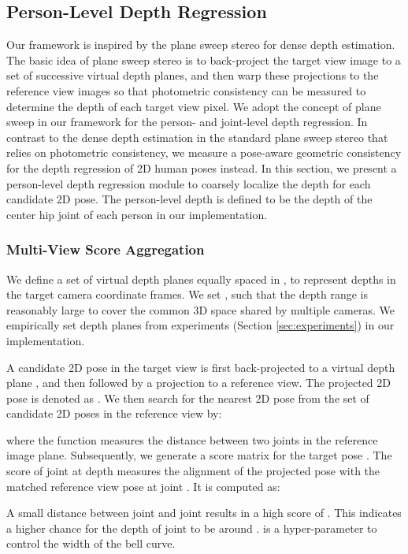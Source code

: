 \documentclass[final]{cvpr}
\begin{document}
\subsection{Person-Level Depth Regression}\label{subsec:person-level}

Our framework is inspired by the plane sweep stereo for dense depth estimation.
The basic idea of plane sweep stereo is to back-project the target view image to a set of successive virtual depth planes, and then warp these projections to the reference view images so that photometric consistency can be measured to determine the depth of each target view pixel.
We adopt the concept of plane sweep in our framework for the person- and joint-level depth regression.
In contrast to the dense depth estimation in the standard plane sweep stereo that relies on photometric consistency, we measure a pose-aware geometric consistency for the depth regression of 2D human poses instead.
In this section, we present a person-level depth regression module to coarsely localize the depth for each candidate 2D pose.
The person-level depth is defined to be the depth of the center hip joint of each person in our implementation.

\subsubsection{Multi-View Score Aggregation}\label{subsec:score_aggregation}

We define a set of  virtual depth planes equally spaced in ,  to represent depths in the target camera coordinate frames.  
We set ,  such that the depth range is reasonably large to cover the common 3D space shared by multiple cameras.
We empirically set  depth planes from experiments (\cf Section \ref{sec:experiments}) in our implementation.

A candidate 2D pose  in the target view is first back-projected to a virtual depth plane , and then followed by a projection to a reference view.
The projected 2D pose is denoted as .
We then search for the nearest 2D pose  from the set of candidate 2D poses  in the reference view by:

where the function  measures the distance between two joints in the reference image plane.
Subsequently, we generate a score matrix  for the target pose .
The score of joint  at depth  measures the alignment of the projected pose  with the matched reference view pose  at joint . It is computed as:

A small distance between joint  and joint  results in a high score of . This indicates a higher chance for the depth of joint  to be around .
 is a hyper-parameter to control the width of the bell curve.
\end{document}
